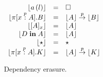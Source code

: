 \begin{figure}

\begin{center}
\begin{math}
\begin{array}{rclr}
\lfloor a\,(l) \rfloor
&=&
\square
\\

\lfloor \pi [x \stackrel{p}{:} A]. B \rfloor
&=&
\lfloor A \rfloor \stackrel{p}{\rightarrow} \lfloor B \rfloor
\\

\lfloor [ A ]_{x} \rfloor
&=&
\lfloor A \rfloor
\\

\lfloor D \;\textbf{in}\; A \rfloor
&=&
\lfloor A \rfloor
\\

\lfloor \star \rfloor
&=&
\star
\\

\lfloor \pi [x \stackrel{p}{:} A]. K \rfloor
&=&
\lfloor A \rfloor \stackrel{p}{\rightarrow} \lfloor K \rfloor
\\

\end{array}
\end{math}
\end{center}
\caption{Dependency erasure.}
\end{figure}
